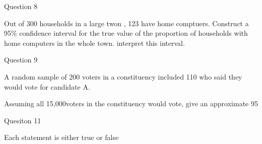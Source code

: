Question 8

Out of 300 households in a large twon , 123 have home comptuers. Construct a 95\% confidence interval for the true value of the 
proportion of households with home computers in the whole town. interpret this interval.

Question 9

A random sample of 200 voters in a constituency included 110 who said they would vote for candidate A.

Assuming all 15,000voters in the constituency would vote, give an approximate 95%



Quesiton 11

Each statement is either true or false


